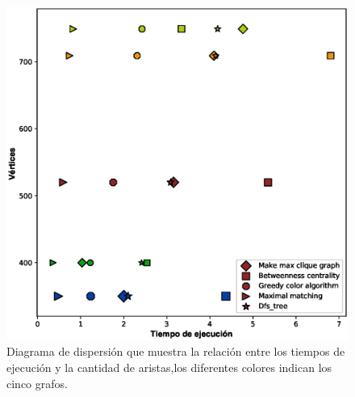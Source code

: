 \documentclass{article}
\begin{document}
\begin{figure}[h]
\includegraphics[scale=0.7]{DiagramVertices.eps}
\caption{Diagrama de dispersión que muestra la relación entre los tiempos de ejecución y la cantidad de aristas,los diferentes colores indican los cinco grafos.}
\end{figure}
 
\newpage

\newpage


\end{document}
